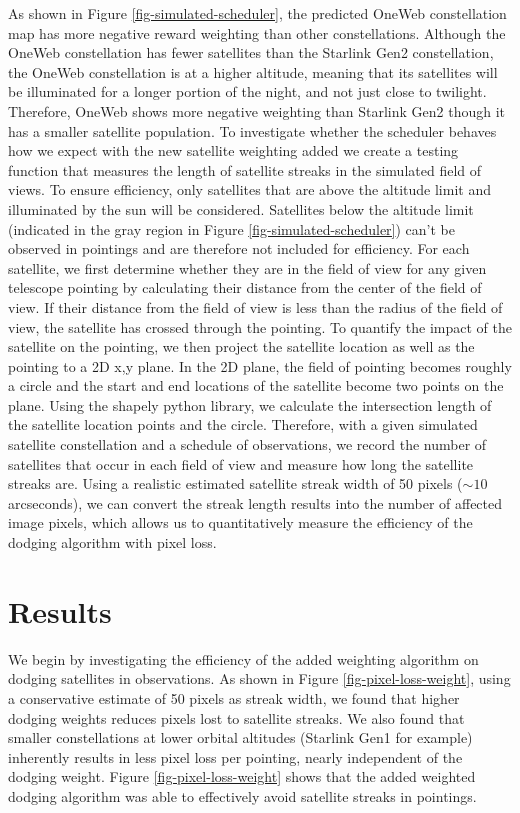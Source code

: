 \documentclass[linenumbers]{aastex631}
\begin{document}
As shown in Figure \ref{fig-simulated-scheduler}, the predicted OneWeb constellation map has more negative reward weighting than other constellations. Although the OneWeb constellation has fewer satellites than the Starlink Gen2 constellation, the OneWeb constellation is at a higher altitude, meaning that its satellites will be illuminated for a longer portion of the night, and not just close to twilight. Therefore, OneWeb shows more negative weighting than Starlink Gen2 though it has a smaller satellite population. To investigate whether the scheduler behaves how we expect with the new satellite weighting added we create a testing function that measures the length of satellite streaks in the simulated field of views. To ensure efficiency, only satellites that are above the altitude limit and illuminated by the sun will be considered. Satellites below the altitude limit (indicated in the gray region in Figure \ref{fig-simulated-scheduler}) can’t be observed in pointings and are therefore not included for efficiency. For each satellite, we first determine whether they are in the field of view for any given telescope pointing by calculating their distance from the center of the field of view. If their distance from the field of view is less than the radius of the field of view, the satellite has crossed through the pointing. To quantify the impact of the satellite on the pointing, we then project the satellite location as well as the pointing to a 2D x,y plane. In the 2D plane, the field of pointing becomes roughly a circle and the start and end locations of the satellite become two points on the plane. Using the shapely python library, we calculate the intersection length of the satellite location points and the circle. Therefore, with a given simulated satellite constellation and a schedule of observations, we record the number of satellites that occur in each field of view and measure how long the satellite streaks are. Using a realistic estimated satellite streak width of 50 pixels ($\sim10$ arcseconds), we can convert the streak length results into the number of affected image pixels, which allows us to quantitatively measure the efficiency of the dodging algorithm with pixel loss. 

\section{Results}
We begin by investigating the efficiency of the added weighting algorithm on dodging satellites in observations. As shown in Figure \ref{fig-pixel-loss-weight}, using a conservative estimate of 50 pixels as streak width, we found that higher dodging weights reduces pixels lost to satellite streaks. We also found that smaller constellations at lower orbital altitudes (Starlink Gen1 for example) inherently results in less pixel loss per pointing, nearly independent of the dodging weight. Figure \ref{fig-pixel-loss-weight} shows that the added weighted dodging algorithm was able to effectively avoid satellite streaks in pointings.
\end{document}
